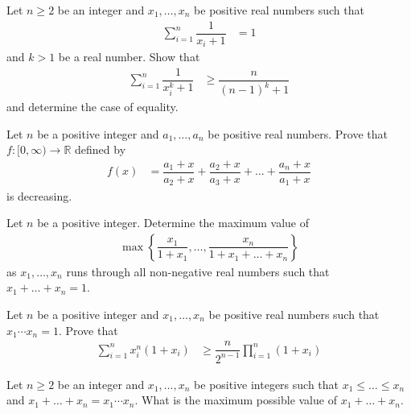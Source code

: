\documentclass{subfile}
\begin{document}
		\begin{problem}
			Let $n\geq2$ be an integer and $x_{1},\ldots,x_{n}$ be positive real numbers such that
				\begin{align*}
					\sum_{i=1}^{n}\dfrac{1}{x_{i}+1}
						& = 1
				\end{align*}
			and $k>1$ be a real number. Show that
				\begin{align*}
					\sum_{i=1}^{n}\dfrac{1}{x_{i}^{k}+1}
						& \geq \dfrac{n}{(n-1)^{k}+1}
				\end{align*}
			and determine the case of equality.
		\end{problem}
	
		\begin{problem}
			Let $n$ be a positive integer and $a_{1},\ldots,a_{n}$ be positive real numbers. Prove that $f:[0,\infty)\to\mathbb{R}$ defined by
				\begin{align*}
					f(x)
						& = \dfrac{a_{1}+x}{a_{2}+x}+\dfrac{a_{2}+x}{a_{3}+x}+\ldots+\dfrac{a_{n}+x}{a_{1}+x}
				\end{align*}
			is decreasing.
		\end{problem}
	
		\begin{problem}
			Let $n$ be a positive integer. Determine the maximum value of
				\begin{align*}
					\max\left\{\dfrac{x_{1}}{1+x_{1}},\ldots,\dfrac{x_{n}}{1+x_{1}+\ldots+x_{n}}\right\}
				\end{align*}
			as $x_{1},\ldots,x_{n}$ runs through all non-negative real numbers such that $x_{1}+\ldots+x_{n}=1$.
		\end{problem}
	
		\begin{problem}
			Let $n$ be a positive integer and $x_{1},\ldots,x_{n}$ be positive real numbers such that $x_{1}\cdots x_{n}=1$. Prove that
				\begin{align*}
					\sum_{i=1}^{n}x_{i}^{n}(1+x_{i})
						& \geq \dfrac{n}{2^{n-1}}\prod_{i=1}^{n}(1+x_{i})
				\end{align*}
		\end{problem}
	
		\begin{problem}
			Let $n\geq 2$ be an integer and $x_{1},\ldots,x_{n}$ be positive integers such that $x_{1}\leq\ldots\leq x_{n}$ and $x_{1}+\ldots+x_{n}=x_{1}\cdots x_{n}$. What is the maximum possible value of $x_{1}+\ldots+x_{n}$.
		\end{problem}
	
\end{document}
